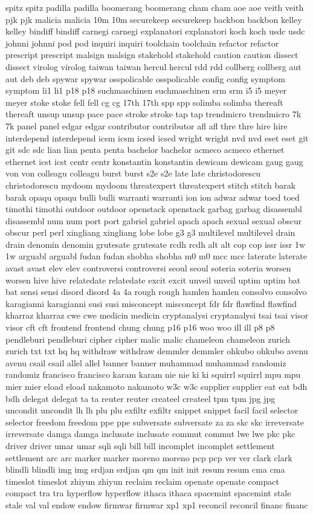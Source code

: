 \documentclass[conference]{IEEEtran}
\begin{document}
spitz spitz padilla padilla boomerang boomerang cham cham aoe aoe veith veith pjk pjk malicia malicia 10m 10m securekeep securekeep backbon backbon kelley kelley bindiff bindiff carnegi carnegi explanatori explanatori koch koch usdc usdc johnni johnni pod pod inquiri inquiri toolchain toolchain refactor refactor prescript prescript malsign malsign stakehold stakehold caution caution dissect dissect virolog virolog taiwan taiwan hercul hercul rdd rdd collberg collberg aut aut deb deb spywar spywar osspolicable osspolicable config config symptom symptom li1 li1 p18 p18 suchmaschinen suchmaschinen srm srm i5 i5 meyer meyer stoke stoke fell fell cg cg 17th 17th spp spp solimba solimba thereaft thereaft unsup unsup pace pace stroke stroke tap tap trendmicro trendmicro 7k 7k panel panel edgar edgar contributor contributor afl afl thre thre hire hire interdepend interdepend icsm icsm icsed icsed wright wright nvd nvd eset eset git git sdc sdc lian lian penta penta bachelor bachelor acmeco acmeco ethernet ethernet icst icst centr centr konstantin konstantin dewicam dewicam gaug gaug von von colleagu colleagu burst burst s2e s2e late late christodorescu christodorescu mydoom mydoom threatexpert threatexpert stitch stitch barak barak opaqu opaqu bulli bulli warranti warranti ion ion adwar adwar toed toed timothi timothi outdoor outdoor openstack openstack garbag garbag disassembl disassembl num num port port gabriel gabriel apach apach sexual sexual obscur obscur perl perl xingliang xingliang lobe lobe g3 g3 multilevel multilevel drain drain denomin denomin grutesate grutesate rcdh rcdh alt alt cop cop issr issr 1w 1w arguabl arguabl fudan fudan shobha shobha m0 m0 mcc mcc laterate laterate avast avast elev elev controversi controversi seoul seoul soteria soteria worsen worsen hive hive relatedate relatedate excit excit unveil unveil uptim uptim bat bat sensi sensi disord disord 4a 4a rough rough hamlen hamlen consolvo consolvo karagianni karagianni susi susi misconcept misconcept fdr fdr flawfind flawfind kharraz kharraz cwe cwe medicin medicin cryptanalysi cryptanalysi tsai tsai visor visor cft cft frontend frontend chung chung p16 p16 woo woo ill ill p8 p8 pendleburi pendleburi cipher cipher malic malic chameleon chameleon zurich zurich txt txt hq hq withdraw withdraw demmler demmler ohkubo ohkubo avenu avenu csail csail allel allel banner banner muhammad muhammad randomiz randomiz francisco francisco karam karam nie nie ki ki squirrl squirrl mpu mpu mier mier eload eload nakamoto nakamoto w3c w3c supplier supplier eat eat bdh bdh delegat delegat ta ta reuter reuter createel createel tpm tpm jpg jpg uncondit uncondit lh lh plu plu exfiltr exfiltr snippet snippet facil facil selector selector freedom freedom ppe ppe subversate subversate za za skc skc irreversate irreversate damga damga inclusate inclusate commut commut lwe lwe pkc pkc driver driver umar umar sqli sqli bill bill incomplet incomplet settlement settlement arc arc marker marker moreno moreno pcp pcp ver ver clark clark blindli blindli img img srdjan srdjan qm qm init init resum resum cma cma timeslot timeslot zhiyun zhiyun reclaim reclaim openate openate compact compact tra tra hyperflow hyperflow ithaca ithaca spacemint spacemint stale stale val val endow endow firmwar firmwar xp1 xp1 reconcil reconcil financ financ 
\end{document}
